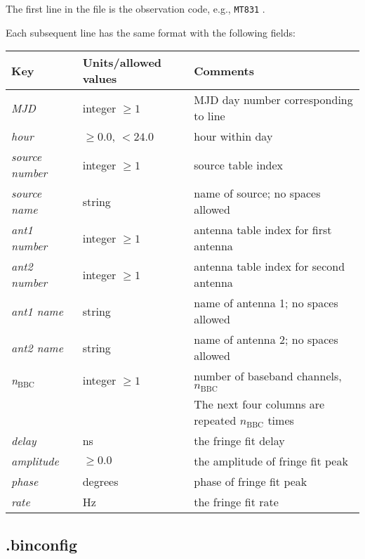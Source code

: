 The first line in the file is the observation code, e.g., {\tt MT831} .

Each subsequent line has the same format with the following fields:

\begin{center}
\begin{tabular}{l l l}
\hline
Key & Units/allowed values & Comments \\
\hline
{\it MJD}           & integer $\ge 1$    & MJD day number corresponding to line \\
{\it hour}          & $\ge 0.0$, $< 24.0$ & hour within day \\
{\it source number} & integer $\ge 1$    & source table index \\
{\it source name}   & string             & name of source; no spaces allowed \\
{\it ant1 number}   & integer $\ge 1$    & antenna table index for first antenna \\
{\it ant2 number}   & integer $\ge 1$    & antenna table index for second antenna \\
{\it ant1 name}     & string             & name of antenna 1; no spaces allowed \\
{\it ant2 name}     & string             & name of antenna 2; no spaces allowed \\
{\it n}$_{\mathrm{BBC}}$  & integer $\ge 1$    & number of baseband channels, $n_{\mathrm{BBC}}$ \\
& & The next four columns are repeated $n_{\mathrm{BBC}}$ times \\
\hline
{\it delay}         & ns                 & the fringe fit delay \\
{\it amplitude}     & $\ge 0.0$          & the amplitude of fringe fit peak \\
{\it phase}         & degrees            & phase of fringe fit peak \\
{\it rate}          & Hz                 & the fringe fit rate \\
\hline
\end{tabular}
\end{center}









\subsection{.binconfig} \label{sec:binconfig}

